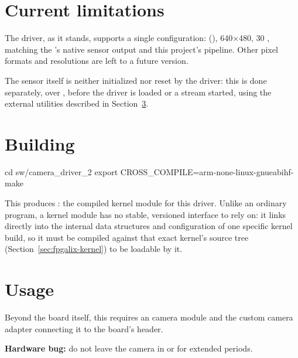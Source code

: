 \section{Current limitations}
\label{sec:fpgalix-camera-limitations}

The driver, as it stands, supports a single configuration:  (), 640$\times$480, 30 , matching the 's native sensor output and this project's  pipeline. Other pixel formats and resolutions are left to a future version.

The  sensor itself is neither initialized nor reset by the driver: this is done separately, over , before the driver is loaded or a stream started, using the external utilities described in Section~\ref{sec:fpgalix-camera-usage}.

\section{Building}
\label{sec:fpgalix-camera-building}

\begin{shellcodehost}
cd sw/camera_driver_2
export CROSS_COMPILE=arm-none-linux-gnueabihf-
make
\end{shellcodehost}

This produces : the compiled kernel module for this driver. Unlike an ordinary program, a kernel module has no stable, versioned interface to rely on: it links directly into the internal data structures and configuration of one specific kernel build, so it must be compiled against that exact kernel's source tree (Section~\ref{sec:fpgalix-kernel}) to be loadable by it.

\section{Usage}
\label{sec:fpgalix-camera-usage}

Beyond the  board itself, this requires an  camera module and the custom camera adapter connecting it to the board's  header.

\begin{warningbox}
\textbf{Hardware bug:} do not leave the camera in  or  for extended periods.\footnotemark
\end{warningbox}


